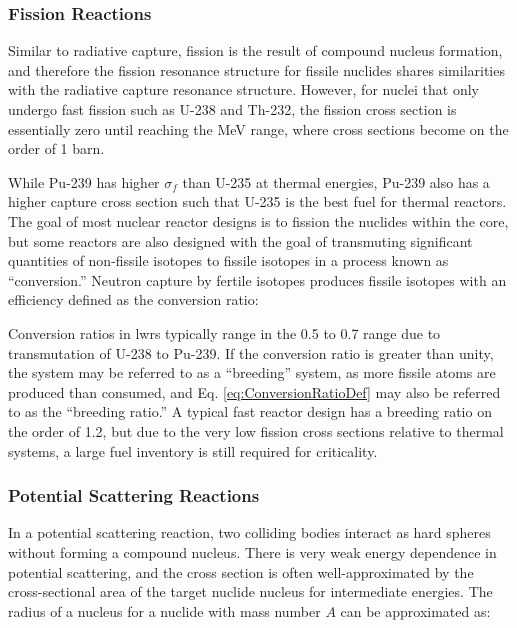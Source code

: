 \subsubsection{Fission Reactions}

Similar to radiative capture, fission is the result of compound nucleus formation, and therefore the fission resonance structure for fissile nuclides shares similarities with the radiative capture resonance structure. However, for nuclei that only undergo fast fission such as U-238 and Th-232, the fission cross section is essentially zero until reaching the MeV range, where cross sections become on the order of 1 barn.

While Pu-239 has higher \(\sigma_f\) than U-235 at thermal energies, Pu-239 also has a higher capture cross section such that U-235 is the best fuel for thermal reactors. The goal of most nuclear reactor designs is to fission the nuclides within the core, but some reactors are also designed with the goal of transmuting significant quantities of non-fissile isotopes to fissile isotopes in a process known as ``conversion.'' Neutron capture by fertile isotopes produces fissile isotopes with an efficiency defined as the conversion ratio:

\beq
\label{eq:ConversionRatioDef}
\equiv{}
\eeq

Conversion ratios in \glspl{lwr} typically range in the 0.5 to 0.7 range due to transmutation of U-238 to Pu-239. If the conversion ratio is greater than unity, the system may be referred to as a ``breeding'' system, as more fissile atoms are produced than consumed, and Eq. \eqref{eq:ConversionRatioDef} may also be referred to as the ``breeding ratio.'' A typical fast reactor design has a breeding ratio on the order of 1.2, but due to the very low fission cross sections relative to thermal systems, a large fuel inventory is still required for criticality.

\subsubsection{Potential Scattering Reactions}
\label{sec:PotentialScattering}

In a potential scattering reaction, two colliding bodies interact as hard spheres without forming a compound nucleus. There is very weak energy dependence in potential scattering, and the cross section is often well-approximated by the cross-sectional area of the target nuclide nucleus for intermediate energies. The radius of a nucleus for a nuclide with mass number \(A\) can be approximated as:

